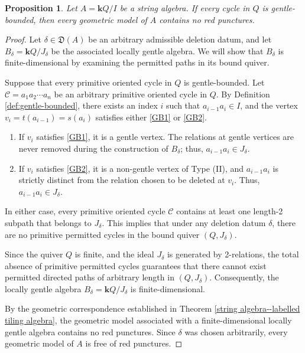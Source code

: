 \documentclass[11pt]{amsart}
\numberwithin{equation}{section}
\newtheorem{proposition}[theorem]{Proposition}
\theoremstyle{definition}
\begin{document}
\begin{proposition}\label{pro:cycle}
 	Let $A = \mathbf{k}Q/I$ be a string algebra. If  every cycle in $Q$ is gentle-bounded, then every geometric model of $A$ contains no red punctures.
 \end{proposition}

\begin{proof}
Let $\delta \in \mathfrak{D}(A)$ be an arbitrary admissible deletion datum, and let $B_\delta = \mathbf{k}Q/J_\delta$ be the associated locally gentle algebra. We will show that $B_\delta$ is finite-dimensional by examining the permitted paths in its bound quiver.

Suppose that every primitive oriented cycle in $Q$ is gentle-bounded. Let $\mathcal{C} = a_1 a_2 \cdots a_n$ be an arbitrary primitive oriented cycle in $Q$. By Definition \ref{def:gentle-bounded}, there exists an index $i$ such that $a_{i-1}a_i \in I$, and the vertex $v_i = t(a_{i-1}) = s(a_i)$ satisfies either \ref{GB1} or \ref{GB2}. 
\begin{enumerate}
    \item If $v_i$ satisfies \ref{GB1}, it is a gentle vertex. The relations at gentle vertices are never removed during the construction of $B_\delta$; thus, $a_{i-1}a_i \in J_\delta$.
    \item If $v_i$ satisfies \ref{GB2}, it is a non-gentle vertex of Type (II), and $a_{i-1}a_i$ is strictly distinct from the relation chosen to be deleted at $v_i$. Thus, $a_{i-1}a_i \in J_\delta$.
\end{enumerate}

In either case, every primitive oriented cycle $\mathcal{C}$ contains at least one length-2 subpath that belongs to $J_\delta$. This implies that under any deletion datum $\delta$, there are no primitive permitted cycles in the bound quiver $(Q, J_\delta)$.

Since the quiver $Q$ is finite, and the ideal $J_\delta$ is generated by 2-relations, the total absence of primitive permitted cycles guarantees that there cannot exist permitted directed paths of arbitrary length in $(Q, J_\delta)$. Consequently, the locally gentle algebra $B_\delta = \mathbf{k}Q/J_\delta$ is finite-dimensional.

By the geometric correspondence established in Theorem \ref{string algebra--labelled tiling algebra}, the geometric model associated with a finite-dimensional locally gentle algebra contains no red punctures. Since $\delta$ was chosen arbitrarily, every geometric model of $A$ is free of red punctures.
\end{proof}
\end{document}
